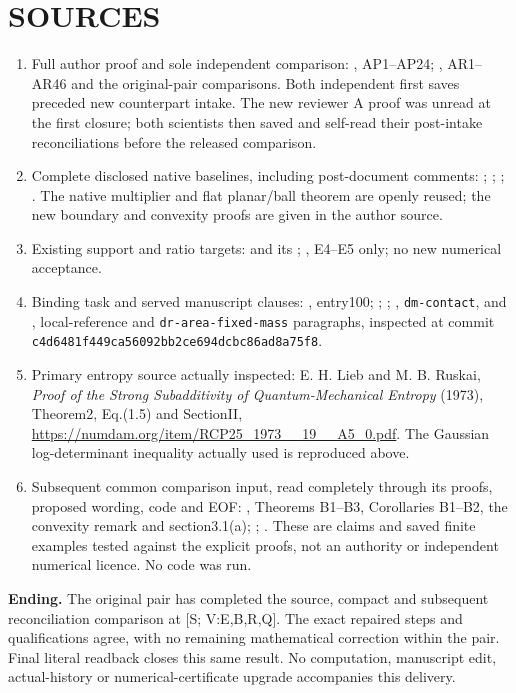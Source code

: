 \documentclass[10pt]{article}
\begin{document}
\section*{SOURCES}
\begin{enumerate}
\item Full author proof and sole independent comparison:
, AP1--AP24;
,
AR1--AR46 and the original-pair comparisons. Both independent first
saves preceded new counterpart intake. The new reviewer A proof was unread
at the first closure; both scientists then saved and self-read their
post-intake reconciliations before the released comparison.
\item Complete disclosed native baselines, including post-document comments:
;
;
;
.
The native multiplier and flat planar/ball theorem are openly reused;
the new boundary and convexity proofs are given in the author source.
\item Existing support and ratio targets:
and its ;
,
E4--E5 only; no new numerical acceptance.
\item Binding task and served manuscript clauses:
, entry100;
;
;
,
\texttt{dm-contact}, and
,
local-reference and \texttt{dr-area-fixed-mass} paragraphs, inspected at
commit \texttt{c4d6481f449ca56092bb2ce694dcbc86ad8a75f8}.
\item Primary entropy source actually inspected: E. H. Lieb and M. B. Ruskai,
\emph{Proof of the Strong Subadditivity of Quantum-Mechanical Entropy}
(1973), Theorem2, Eq.(1.5) and SectionII,
\url{https://numdam.org/item/RCP25_1973__19__A5_0.pdf}.
The Gaussian log-determinant inequality actually used is reproduced above.
\item Subsequent common comparison input, read completely through its
proofs, proposed wording, code and EOF:
,
Theorems B1--B3, Corollaries B1--B2, the convexity remark and section3.1(a);
;
.
These are claims and saved finite examples tested against the explicit
proofs, not an authority or independent numerical licence. No code was run.
\end{enumerate}
\noindent\textbf{Ending.} The original pair has completed the source,
compact and subsequent reconciliation comparison at [S; V:E,B,R,Q].
The exact repaired steps and qualifications agree, with no remaining
mathematical correction within the pair. Final literal readback closes
this same result. No computation,
manuscript edit, actual-history or numerical-certificate upgrade
accompanies this delivery.
\end{document}
